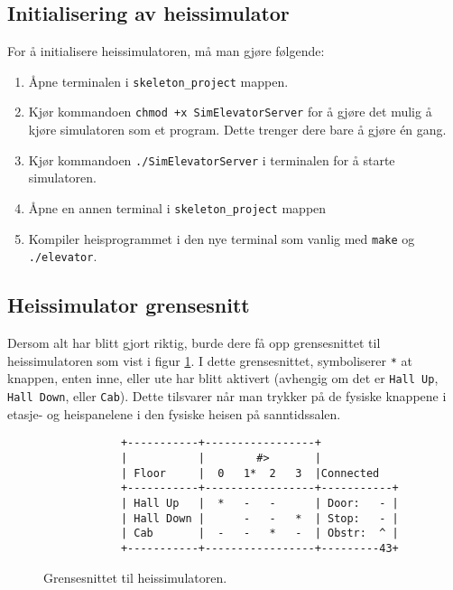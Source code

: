 \subsection{Initialisering av heissimulator}
For å initialisere heissimulatoren, må man gjøre følgende:

\begin{enumerate}
    \item Åpne terminalen i \verb|skeleton_project| mappen.
    \item  Kjør kommandoen \verb|chmod +x SimElevatorServer| for å gjøre det mulig å kjøre simulatoren som et program. Dette trenger dere bare å gjøre én gang.
    \item Kjør kommandoen \verb|./SimElevatorServer| i terminalen for å starte simulatoren.
    \item Åpne en annen terminal i \verb|skeleton_project| mappen
    \item Kompiler heisprogrammet i den nye terminal som vanlig med \verb|make| og \verb|./elevator|.
\end{enumerate}



\subsection{Heissimulator grensesnitt}

Dersom alt har blitt gjort riktig, burde dere få opp grensesnittet til heissimulatoren som vist i figur \ref{fig:ascii-box}. I dette grensesnittet, symboliserer \verb|*| at knappen, enten inne, eller ute har blitt aktivert (avhengig om det er \verb|Hall Up|, \verb|Hall Down|, eller \verb|Cab|). Dette tilsvarer når man trykker på de fysiske knappene i etasje- og heispanelene i den fysiske heisen på sanntidssalen.

\begin{figure}[ht]
\centering
\begin{verbatim}
            +-----------+-----------------+
            |           |        #>       |
            | Floor     |  0   1*  2   3  |Connected
            +-----------+-----------------+-----------+
            | Hall Up   |  *   -   -      | Door:   - |
            | Hall Down |      -   -   *  | Stop:   - |
            | Cab       |  -   -   *   -  | Obstr:  ^ |
            +-----------+-----------------+---------43+
\end{verbatim}
\caption{Grensesnittet til heissimulatoren.}
\label{fig:ascii-box}
\end{figure}


